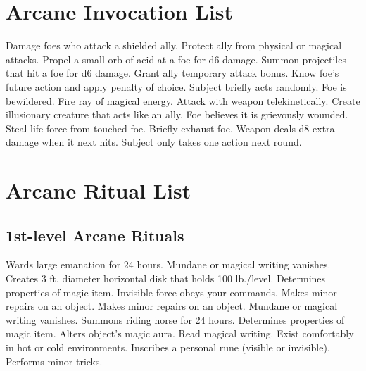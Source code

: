 \section{Arcane Invocation List}
\begin{swspelllist}
   Damage foes who attack a shielded ally.
   Protect ally from physical or magical attacks.
   Propel a small orb of acid at a foe for d6 damage.
   Summon projectiles that hit a foe for d6 damage.
   Grant ally temporary attack bonus.
   Know foe's future action and apply penalty of choice.
   Subject briefly acts randomly.
   Foe is bewildered.
   Fire ray of magical energy.
   Attack with weapon telekinetically.
   Create illusionary creature that acts like an ally.
   Foe believes it is grievously wounded.
   Steal life force from touched foe.
   Briefly exhaust foe.
   Weapon deals d8 extra damage when it next hits.
   Subject only takes one action next round.
\end{swspelllist}

\section{Arcane Ritual List}
\subsection{1st-level Arcane Rituals}
\begin{rituallist}
   Wards large emanation for 24 hours.
   Mundane or magical writing vanishes.
   Creates 3 ft. diameter horizontal disk that holds 100 lb./level.
   Determines properties of magic item.
   Invisible force obeys your commands.
   Makes minor repairs on an object.
   Makes minor repairs on an object.
   Mundane or magical writing vanishes.
   Summons riding horse for 24 hours.
   Determines properties of magic item.
   Alters object's magic aura.
   Read magical writing.
   Exist comfortably in hot or cold environments.
   Inscribes a personal rune (visible or invisible).
   Performs minor tricks.
\end{rituallist}

